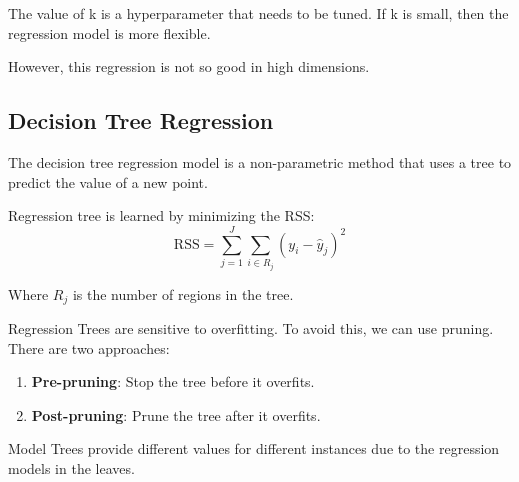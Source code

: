 The value of k is a hyperparameter that needs to be tuned. If k is small, then the regression model is more flexible.

However, this regression is not so good in high dimensions.

\subsection*{Decision Tree Regression}
The decision tree regression model is a non-parametric method that uses a tree to predict the value of a new point.

Regression tree is learned by minimizing the RSS:
$$\text{RSS} = \sum_{j=1}^{J} \sum_{i \in R_j} (y_i - \hat{y}_j)^2$$

Where $R_j$ is the number of regions in the tree.

Regression Trees are sensitive to overfitting. To avoid this, we can use pruning. There are two approaches:
\begin{enumerate}[noitemsep]
    \item \textbf{Pre-pruning}: Stop the tree before it overfits.
    \item \textbf{Post-pruning}: Prune the tree after it overfits.
\end{enumerate}

Model Trees provide different values for different instances due to the regression models in the leaves.
